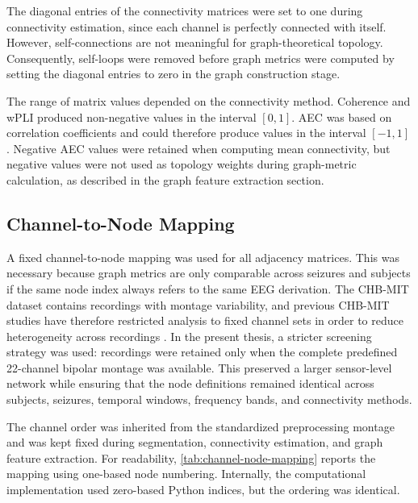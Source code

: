 The diagonal entries of the connectivity matrices were set to one during
connectivity estimation, since each channel is perfectly connected with itself.
However, self-connections are not meaningful for graph-theoretical topology.
Consequently, self-loops were removed before graph metrics were computed by
setting the diagonal entries to zero in the graph construction stage.

The range of matrix values depended on the connectivity method. Coherence and
wPLI produced non-negative values in the interval $[0,1]$. AEC was based on
correlation coefficients and could therefore produce values in the interval
$[-1,1]$. Negative AEC values were retained when computing mean connectivity,
but negative values were not used as topology weights during graph-metric
calculation, as described in the graph feature extraction section.

\subsection{Channel-to-Node Mapping}
\label{subsec:channel-to-node-mapping}

A fixed channel-to-node mapping was used for all adjacency matrices. This was
necessary because graph metrics are only comparable across seizures and
subjects if the same node index always refers to the same EEG derivation.
The CHB-MIT dataset contains recordings with montage variability, and previous
CHB-MIT studies have therefore restricted analysis to fixed channel sets in
order to reduce heterogeneity across recordings \cite{Tsiouris2018}. In the
present thesis, a stricter screening strategy was used: recordings were retained
only when the complete predefined \num{22}-channel bipolar montage was
available. This preserved a larger sensor-level network while ensuring that the
node definitions remained identical across subjects, seizures, temporal
windows, frequency bands, and connectivity methods.

The channel order was inherited from the standardized preprocessing montage and
was kept fixed during segmentation, connectivity estimation, and graph feature
extraction. For readability, \cref{tab:channel-node-mapping} reports the
mapping using one-based node numbering. Internally, the computational
implementation used zero-based Python indices, but the ordering was identical.

